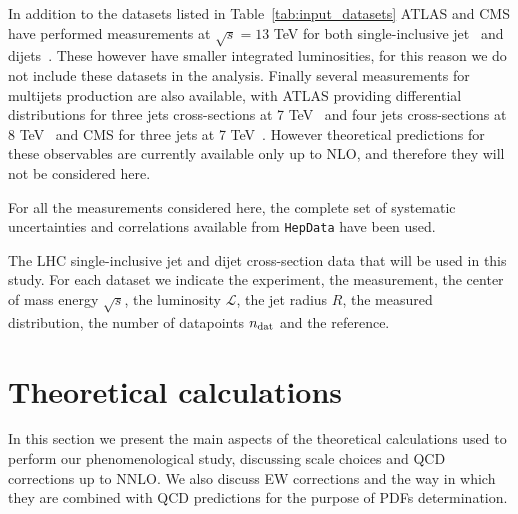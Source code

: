 %
In addition to the datasets listed in Table~\ref{tab:input_datasets} ATLAS and CMS have performed
measurements at $\sqrt{s}=13$ TeV for both single-inclusive jet~\cite{Aaboud:2017wsi,Khachatryan:2016wdh}
and dijets~\cite{Aaboud:2017wsi,Sirunyan:2020uoj}. These however have smaller integrated luminosities, for this reason
we do not include these datasets in the analysis. 
%
Finally several measurements for multijets production are also available, with ATLAS providing differential distributions for
three jets cross-sections at 7 TeV~\cite{Aad:2014rma} and four jets cross-sections at 8 TeV~\cite{Aad:2015nda} 
and CMS for three jets at 7 TeV~\cite{CMS:2014mna}.
However theoretical predictions for these observables are currently available only up to NLO, and therefore they will
not be considered here.

%
For all the measurements considered here, the complete set of systematic uncertainties and correlations available from
{\tt HepData} have been used.

\begin{table}[!t]
    \centering
    \scriptsize
    \renewcommand{\arraystretch}{1.90}
    
    \vspace{0.3cm}
    \caption{\small The LHC single-inclusive jet and dijet cross-section data
       that will be used  in this study. For each dataset we indicate the experiment,
       the measurement, the center of mass energy $\sqrt{s}$, the luminosity 
       $\mathcal{L}$, the jet radius $R$, the measured distribution, the number of 
       datapoints $n_{\rm dat}$ and the reference.}
    \label{tab:input_datasets}
\end{table}
    


\section{Theoretical calculations}
In this section we present the main aspects of the theoretical calculations used to perform
our phenomenological study, discussing scale choices and QCD corrections up to NNLO.
We also discuss EW corrections and the way in which they are combined with QCD predictions for the 
purpose of PDFs determination.

